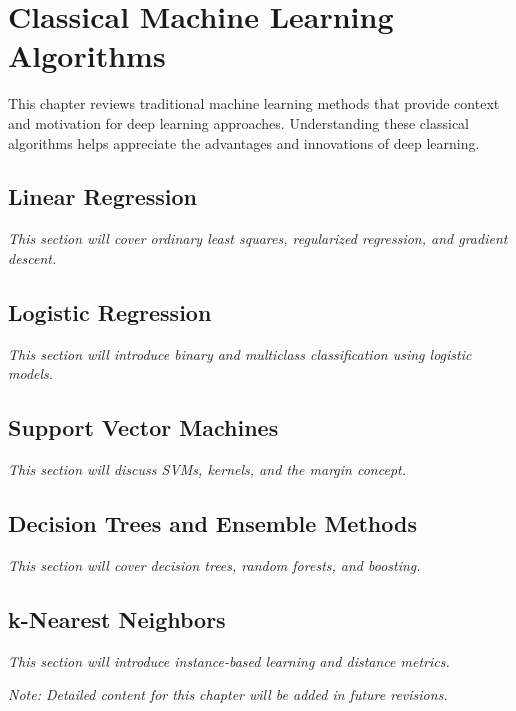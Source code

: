 
\chapter{Classical Machine Learning Algorithms}
\label{chap:classical-ml}

This chapter reviews traditional machine learning methods that provide context and motivation for deep learning approaches. Understanding these classical algorithms helps appreciate the advantages and innovations of deep learning.

\section{Linear Regression}

\textit{This section will cover ordinary least squares, regularized regression, and gradient descent.}

\section{Logistic Regression}

\textit{This section will introduce binary and multiclass classification using logistic models.}

\section{Support Vector Machines}

\textit{This section will discuss SVMs, kernels, and the margin concept.}

\section{Decision Trees and Ensemble Methods}

\textit{This section will cover decision trees, random forests, and boosting.}

\section{k-Nearest Neighbors}

\textit{This section will introduce instance-based learning and distance metrics.}

\vspace{1em}
\noindent\textit{Note: Detailed content for this chapter will be added in future revisions.}
